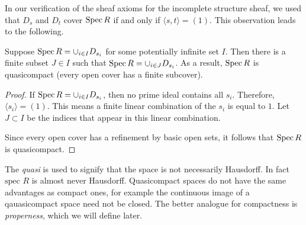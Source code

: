 In our verification of the sheaf axioms for the incomplete structure sheaf, we used that \(D_s\) and \(D_t\) cover \(\operatorname{Spec} R\) if and only if \(\langle s,t\rangle = (1)\).
This observation leads to the following.
\begin{proposition}
  Suppose \(\operatorname{Spec} R = \cup_{i\in I} D_{s_i}\) for some potentially infinite set $I$.
  Then there is a finite subset \(J \in I\) such that \(\operatorname{Spec} R = \cup_{i\in J} D_{s_i}\).
  As a result, \(\operatorname{Spec} R\) is quasicompact (every open cover has a finite subcover).

\end{proposition}
\begin{proof}
  If \(\operatorname{Spec} R = \cup_{i\in I} D_{s_i}\), then no prime ideal contains all \(s_i\).
  Therefore, \(\langle s_i \rangle = (1)\).
  This means a finite linear combination of the $s_i$ is equal to $1$.
  Let \(J \subset I\) be the indices that appear in this linear combination.
   
  Since every open cover has a refinement by basic open sets, it follows that \(\operatorname{Spec} R\) is quasicompact.
\end{proof}

\begin{remark}
  The \emph{quasi} is used to signify that the space is not necessarily Hausdorff.
  In fact $\text{spec }\!R$ is almost never Hausdorff. Quasicompact spaces do not have the same advantages as compact ones, for example the continuous image of a qauasicompact space need not be closed. The better analogue for compactness is {\it properness}, which we will define later.
\end{remark}


